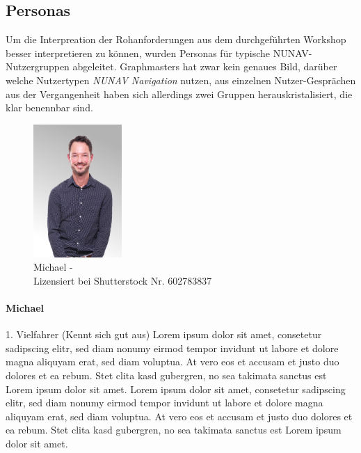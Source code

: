 \subsection{Personas}
\label{sec:06_model_evaluation:personas}

Um die Interpreation der Rohanforderungen aus dem durchgeführten Workshop besser interpretieren zu können, wurden Personas für typische NUNAV-Nutzergruppen abgeleitet. Graphmasters hat zwar kein genaues Bild, darüber welche Nutzertypen \textit{NUNAV Navigation} nutzen, aus einzelnen Nutzer-Gesprächen aus der Vergangenheit haben sich allerdings zwei Gruppen herauskristalisiert, die klar benennbar sind.

\begin{figure}
    \vspace{-\intextsep}
    \centering
    \includegraphics[width=0.3\textwidth]{contents/06_model_evaluation/01_integration/res/persona_picture_michael.png}
    \caption{Michael -\\Lizensiert bei Shutterstock Nr. 602783837}
\end{figure}

\paragraph{Michael} 1. Vielfahrer (Kennt sich gut aus) Lorem ipsum dolor sit amet, consetetur sadipscing elitr, sed diam nonumy eirmod tempor invidunt ut labore et dolore magna aliquyam erat, sed diam voluptua. At vero eos et accusam et justo duo dolores et ea rebum. Stet clita kasd gubergren, no sea takimata sanctus est Lorem ipsum dolor sit amet. Lorem ipsum dolor sit amet, consetetur sadipscing elitr, sed diam nonumy eirmod tempor invidunt ut labore et dolore magna aliquyam erat, sed diam voluptua. At vero eos et accusam et justo duo dolores et ea rebum. Stet clita kasd gubergren, no sea takimata sanctus est Lorem ipsum dolor sit amet.

